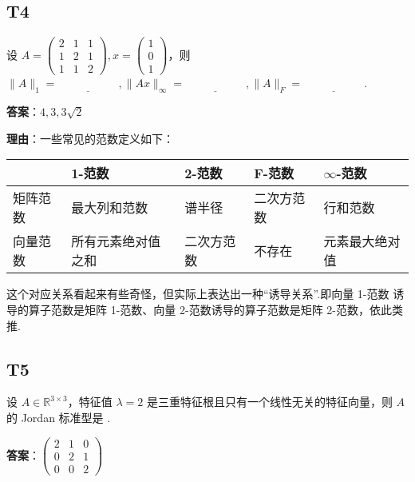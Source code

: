 \documentclass{article}
\begin{document}
\subsection{T4}

\par 设 $A=\begin{pmatrix}
	2 & 1 & 1\\
	1 & 2 & 1\\
	1 & 1 & 2
\end{pmatrix}, x=\begin{pmatrix}
	1\\0\\1
\end{pmatrix}$，则 $\|A\|_1=\underline{\phantom{empty\_space}}, \|Ax\|_{\infty}=\underline{\phantom{empty\_space}}, \|A\|_F=\underline{\phantom{empty\_space}}$.

\par \textbf{答案}：$4, 3, 3\sqrt 2$

\par \textbf{理由}：一些常见的范数定义如下：

\begin{tabularx}{\linewidth}{|X|X|X|X|X|} 
	\hline
	 & 1-范数 & 2-范数 & F-范数 & $\infty$-范数 \\ 
	\hline
	矩阵范数 & 最大列和范数 & 谱半径 & 二次方范数 & 行和范数 \\ 
	\hline
	向量范数 & 所有元素绝对值之和 & 二次方范数 & 不存在 & 元素最大绝对值 \\ 
	\hline
\end{tabularx}

\par 这个对应关系看起来有些奇怪，但实际上表达出一种“诱导关系”.即向量 1-范数 诱导的算子范数是矩阵 1-范数、向量 2-范数诱导的算子范数是矩阵 2-范数，依此类推.

\subsection{T5}

\par 设 $A\in \mathbb R^{3\times 3}$，特征值 $\lambda=2$ 是三重特征根且只有一个线性无关的特征向量，则 $A$ 的 Jordan 标准型是 \underline{\phantom{empty\_space}}.

\par\textbf{答案}：$\begin{pmatrix}
	2 & 1 & 0\\
	0 & 2 & 1\\
	0 & 0 & 2
\end{pmatrix}$
\end{document}
